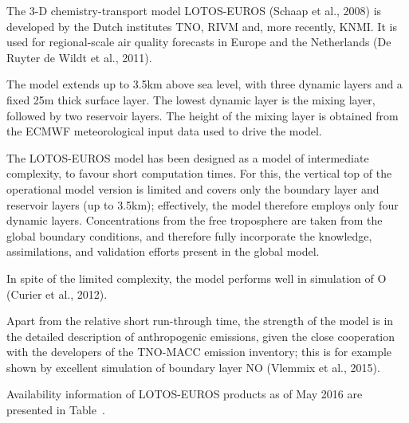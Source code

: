 \documentclass[9pt]{report}
\begin{document}
\noindent{}The 3-D chemistry-transport model LOTOS-EUROS (Schaap et al., 2008) is developed by the Dutch institutes TNO, RIVM and, more recently, KNMI.
It is used for regional-scale air quality forecasts in Europe and the Netherlands (De Ruyter de Wildt et al., 2011).%

The model extends up to 3.5km above sea level, with three dynamic layers and a ﬁxed 25m thick surface layer. 
The lowest dynamic layer is the mixing layer, followed by two reservoir layers. 
The height of the mixing layer is obtained from the ECMWF meteorological input data used to drive the model.%

The LOTOS-EUROS model has been designed as a model of intermediate complexity, to favour short computation times. 
For this, the vertical top of the operational model version is limited and covers only the boundary layer and reservoir layers (up to 3.5km); effectively, the model therefore employs only four dynamic layers. 
Concentrations from the free troposphere are taken from the global boundary conditions, and therefore fully incorporate the knowledge, assimilations, and validation efforts present in the global model.%

In spite of the limited complexity, the model performs well in simulation of O (Curier et al., 2012).%

Apart from the relative short run-through time, the strength of the model is in the detailed description of anthropogenic emissions, given the close cooperation with the developers of the TNO-MACC emission inventory; this is for example shown by excellent simulation of boundary layer NO (Vlemmix et al., 2015).%

Availability information of LOTOS-EUROS products as of May 2016 are presented in Table~.%
\end{document}
